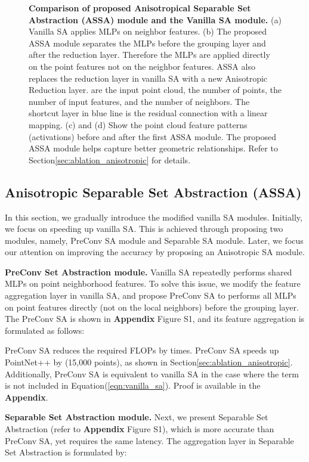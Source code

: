 \documentclass{article}
\newcommand{\eqnLabel}{Equation\xspace}
\newcommand{\eqnref}[1]{(\ref{#1})}
\newcommand{\secLabel}{Section\xspace}
\newcommand{\mysection}[1]{\vspace{3pt}\noindent\textbf{#1.}}
\newcommand{\supp}{\textbf{Appendix}\xspace}
\begin{document}
\begin{figure}[!ht]
\begin{minipage}[t][0mm][t]{.49\textwidth}
\end{minipage}
\caption{
\textbf{Comparison of proposed Anisotropical Separable Set Abstraction (ASSA) module and the Vanilla SA module.} (a) Vanilla SA \cite{Qi2017PointNetDH} applies MLPs on neighbor features. (b) The proposed ASSA module separates the MLPs before the grouping layer and after the reduction layer. Therefore the MLPs are applied directly on the point features not on the neighbor features. ASSA also replaces the reduction layer in vanilla SA with a new Anisotropic Reduction layer. 
 are the input point cloud, the number of points, the number of input features, and the number of neighbors. The shortcut layer in blue line is the residual connection with a linear mapping. 
(c) and (d) Show the point cloud feature patterns (activations) before and after the first ASSA module. The proposed ASSA module helps capture better geometric relationships. Refer to \secLabel \ref{sec:ablation_anisotropic} for details. 
}
\label{fig:sa_module}
\end{figure}



\subsection{Anisotropic Separable Set Abstraction (ASSA)}\label{sec:assa}
In this section, we gradually introduce the modified vanilla SA modules. Initially, we focus on speeding up vanilla SA. This is achieved through proposing two modules, namely, PreConv SA module and Separable SA module. Later, we focus our attention on improving the accuracy by proposing an Anisotropic SA module. 

\mysection{PreConv Set Abstraction module}
Vanilla SA repeatedly performs shared MLPs on point neighborhood features. To solve this issue, we modify the feature aggregation layer in vanilla SA, and propose PreConv SA to performs all MLPs on point features directly (not on the  local neighbors) before the grouping layer. The PreConv SA is shown in \supp Figure  S1, and its  feature aggregation is formulated as follows:

PreConv SA reduces the required FLOPs by  times. PreConv SA speeds up PointNet++ by  (15,000 points), as shown in \secLabel \ref{sec:ablation_anisotropic}. Additionally, PreConv SA is equivalent to vanilla SA in the case where the  term is not included in \eqnLabel \eqnref{eqn:vanilla_sa}. Proof is available in the \supp.

\mysection{Separable Set Abstraction module}
Next, we present Separable Set Abstraction (refer to \supp Figure  S1), which is more accurate than PreConv SA, yet requires the same latency. The aggregation layer in Separable Set Abstraction is formulated by: 
\end{document}
